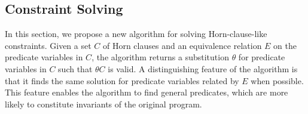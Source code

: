 


\subsection{Constraint Solving}
\label{sec:cs}

In this section, we propose a new algorithm for solving Horn-clause-like
constraints.  Given a set \(C\) of Horn clauses and an equivalence
relation \(E\) on the predicate variables in \(C\), the algorithm
returns a substitution \(\theta\) for predicate variables in \(C\) such
that \(\theta C\) is valid.  A distinguishing feature of the algorithm
is that it finds the same solution for predicate variables related by
\(E\) when possible.  This feature enables the algorithm to find general
predicates, which are more likely to constitute invariants of the
original program.

